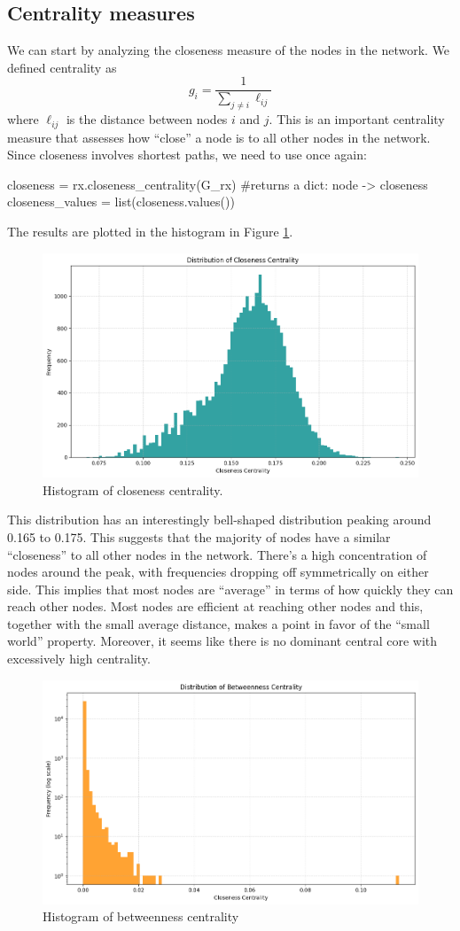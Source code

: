 \documentclass[12pt]{article}
\begin{document}
\subsection{Centrality measures}
We can start by analyzing the closeness measure of the nodes in the network. We defined centrality as
\begin{equation*}
	g_{i}=\frac{1}{\sum_{j\neq i}\ell_{ij}}
\end{equation*}
where $\ell_{ij}$ is the distance between nodes $i$ and $j$. This is an important centrality measure that assesses how ``close'' a node is to all other nodes in the network. Since closeness involves shortest paths, we need to use  once again:
\begin{py}
	closeness = rx.closeness_centrality(G_rx)  #returns a dict: node -> closeness
	closeness_values = list(closeness.values())
\end{py}
The results are plotted in the histogram in Figure \ref{fig:screenshot012}.
\begin{figure}[h]
	\centering
	\includegraphics[width=0.6\linewidth]{screenshot012}
	\caption{Histogram of closeness centrality.}
	\label{fig:screenshot012}
\end{figure}
This distribution has an interestingly bell-shaped distribution peaking around 0.165 to 0.175. This suggests that the majority of nodes have a similar ``closeness'' to all other nodes in the network. There's a high concentration of nodes around the peak, with frequencies dropping off symmetrically on either side. This implies that most nodes are ``average'' in terms of how quickly they can reach other nodes. Most nodes are efficient at reaching other nodes and this, together with the small average distance, makes a point in favor of the ``small world'' property. Moreover, it seems like there is no dominant central core with excessively high centrality.
\begin{figure}[h]
	\centering
	\includegraphics[width=0.6\linewidth]{screenshot013}
	\caption{Histogram of betweenness centrality}
	\label{fig:screenshot013}
\end{figure}
\end{document}
